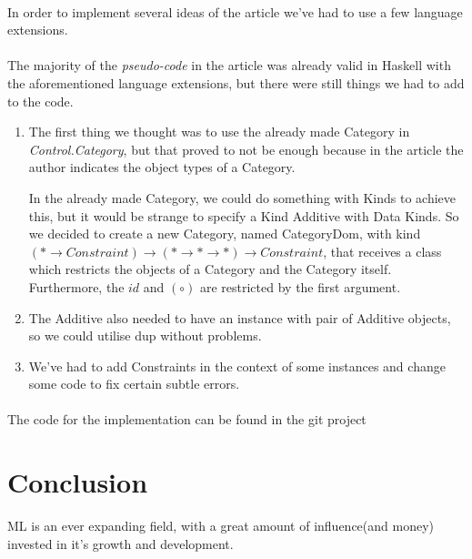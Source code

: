 \documentclass[11pt,a4]{article}
\newcommand{\Conid}[1]{\mathit{#1}}
\newcommand{\Varid}[1]{\mathit{#1}}
\theoremstyle{definition}
\theoremstyle{Definition}
\theoremstyle{Definition}
\begin{document}
	\paragraph{} In order to implement several ideas of the article we've had to use a few language extensions.
	\paragraph{} The majority of the \textit{pseudo-code} in the article was already valid in Haskell with the aforementioned language extensions, but there were still things we had to add to the code.
	\begin{enumerate}
		\item 
		The first thing we thought was to use the already made Category in \textit{Control.Category}, but that proved to not be enough because in the article the author indicates the object types of a Category.
        
		In the already made Category, we could do something with Kinds to achieve this, but it would be strange to specify a Kind Additive with Data Kinds. So we decided to create a new Category, named CategoryDom, with kind \ensuremath{(\mathbin{*}\rightarrow \Conid{Constraint})\rightarrow (\mathbin{*}\rightarrow \mathbin{*}\rightarrow \mathbin{*})\rightarrow \Conid{Constraint}}, that receives a class which restricts the objects of a Category and the Category itself. Furthermore, the \ensuremath{\Varid{id}} and \ensuremath{(\mathbin{\circ})} are restricted by the first argument.
		\item
		The Additive also needed to have an instance with pair of Additive objects, so we could utilise dup without problems.
		\item 
		We've had to add Constraints in the context of some instances and change some code to fix certain subtle errors.
	\end{enumerate}
	\paragraph{} The code for the implementation can be found in the git project\cite{project}
	
	
	\newpage

	\section{Conclusion}

	ML is an ever expanding field, with a great amount of influence(and money) invested in it's growth and development.
\end{document}
